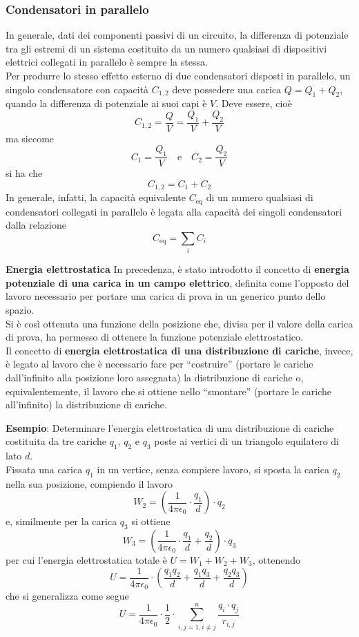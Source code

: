 \documentclass[a4paper]{extarticle}
\newcommand{\quotes}[1]{``#1''}
\begin{document}
\subsubsection{Condensatori in parallelo}
In generale, dati dei componenti passivi di un circuito, la differenza di potenziale tra gli estremi di un sistema costituito da un numero qualsiasi di dispositivi elettrici collegati in parallelo è sempre la stessa.\\
Per produrre lo stesso effetto esterno di due condensatori disposti in parallelo, un singolo condensatore con capacità $C_{1,2}$ deve possedere una carica $Q=Q_1+Q_2$, quando la differenza di potenziale ai suoi capi è $V$. Deve essere, cioè
\[C_{1,2}=\frac{Q}{V}=\frac{Q_1}{V}+\frac{Q_2}{V}\]
ma siccome
\[C_1=\frac{Q_1}{V} \hspace{1em} \text{e} \hspace{1em} C_2=\frac{Q_2}{V}\]
si ha che
\[\boxed{C_{1,2}=C_1+C_2}\]
In generale, infatti, la capacità equivalente $C_\text{eq}$ di un numero qualsiasi di condensatori collegati in parallelo è legata alla capacità dei singoli condensatori dalla relazione
\[{C_\text{eq}}=\sum_i{C_i}\]

\vspace{1em}
\noindent
\textbf{Energia elettrostatica}
In precedenza, è stato introdotto il concetto di \textbf{energia potenziale di una carica in un campo elettrico}, definita come l'opposto del lavoro necessario per portare una carica di prova in un generico punto dello spazio.\\
Si è così ottenuta una funzione della posizione che, divisa per il valore della carica di prova, ha permesso di ottenere la funzione potenziale elettrostatico.\\
Il concetto di \textbf{energia elettrostatica di una distribuzione di cariche}, invece, è legato al lavoro che è necessario fare per \quotes{costruire} (portare le cariche dall'infinito alla posizione loro assegnata) la distribuzione di cariche o, equivalentemente, il lavoro che si ottiene nello \quotes{smontare} (portare le cariche all'infinito) la distribuzione di cariche.

\vspace{1em}
\noindent
\textbf{Esempio}: Determinare l'energia elettrostatica di una distribuzione di cariche costituita da tre cariche $q_1$, $q_2$ e $q_3$ poste ai vertici di un triangolo equilatero di lato $d$.\\
Fissata una carica $q_1$ in un vertice, senza compiere lavoro, si sposta la carica $q_2$ nella sua posizione, compiendo il lavoro
\[W_2=\left(\frac{1}{4 \pi \epsilon_0} \cdot \frac{q_1}{d}\right) \cdot q_2\]
e, similmente per la carica $q_3$ si ottiene
\[W_3=\left(\frac{1}{4 \pi \epsilon_0} \cdot \frac{q_1}{d} + \frac{q_2}{d}\right) \cdot q_3\]
per cui l'energia elettrostatica totale è $U=W_1+W_2+W_3$, ottenendo
\[U=\frac{1}{4 \pi \epsilon_0} \cdot \left(\frac{q_1 q_2}{d}+\frac{q_1q_3}{d}+\frac{q_2q_3}{d}\right)\]
che si generalizza come segue
\[U=\frac{1}{4 \pi \epsilon_0} \cdot \frac{1}{2} \cdot \sum_{i,j=1,i\neq j}^{n} \frac{q_i \cdot q_j}{r_{i,j}}\]
\end{document}
